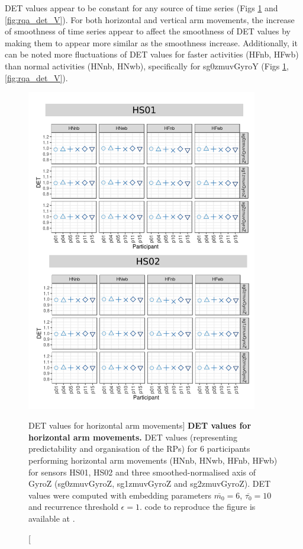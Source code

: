 DET values appear to be constant for any source of time series 
(Figs \ref{fig:rqa_det_H} and \ref{fig:rqa_det_V}).
For both horizontal and vertical arm movements, the increase of smoothness 
of time series appear to affect the smoothness of DET values by making them 
to appear more similar as the smoothness increase.
Additionally, it can be noted more fluctuations of DET values 
for faster activities (HFnb, HFwb) 
than normal activities (HNnb, HNwb), specifically for  sg0zmuvGyroY 
(Figs \ref{fig:rqa_det_H}, \ref{fig:rqa_det_V}).




\begin{figure}
\centering
\includegraphics[width=0.9\textwidth]{rqa_det_H_w500}
    \caption
	[DET values for horizontal arm movements]{
	{\bf DET values for horizontal arm movements.}	
    	DET values (representing predictability and organisation of the RPs)
	for 6 participants performing horizontal arm movements 
	(HNnb, HNwb, HFnb, HFwb)
	for sensors HS01, HS02 and three smoothed-normalised axis 
	of GyroZ (sg0zmuvGyroZ, sg1zmuvGyroZ and sg2zmuvGyroZ).
	DET values were computed with 
	embedding parameters $\overline{m_0}=6$, $\overline{\tau_0}=10$ and
	recurrence threshold $\epsilon=1$.
		\R code to reproduce the figure is available at 
		.
        }
    \label{fig:rqa_det_H}
\end{figure}
